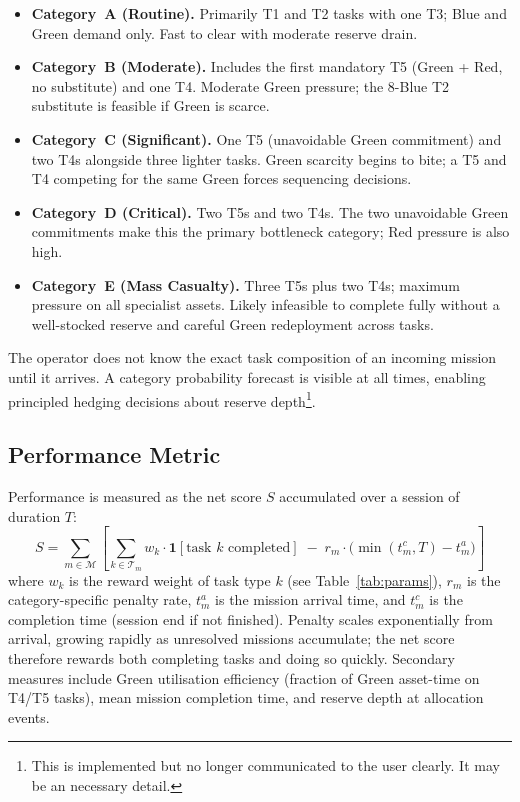 \documentclass[10pt]{article}
\theoremstyle{definition}
\begin{document}
\begin{itemize}[noitemsep]
  \item \textbf{Category~A (Routine).} Primarily T1 and T2 tasks with one T3; Blue and Green demand only. Fast to clear with moderate reserve drain.
  \item \textbf{Category~B (Moderate).} Includes the first mandatory T5 (Green + Red, no substitute) and one T4. Moderate Green pressure; the 8-Blue T2 substitute is feasible if Green is scarce.
  \item \textbf{Category~C (Significant).} One T5 (unavoidable Green commitment) and two T4s alongside three lighter tasks. Green scarcity begins to bite; a T5 and T4 competing for the same Green forces sequencing decisions.
  \item \textbf{Category~D (Critical).} Two T5s and two T4s. The two unavoidable Green commitments make this the primary bottleneck category; Red pressure is also high.
  \item \textbf{Category~E (Mass Casualty).} Three T5s plus two T4s; maximum pressure on all specialist assets. Likely infeasible to complete fully without a well-stocked reserve and careful Green redeployment across tasks.
\end{itemize}

The operator does not know the exact task composition of an incoming mission until it arrives. A category probability forecast is visible at all times, enabling principled hedging decisions about reserve depth\footnote{This is implemented but no longer communicated to the user clearly. It may be an necessary detail.}.

\subsection{Performance Metric}\label{sec:metric}

Performance is measured as the net score $S$ accumulated over a session of duration $T$:
\begin{equation}
S = \sum_{m \in \mathcal{M}} \left[
    \sum_{k \in \mathcal{T}_m} w_k \cdot \mathbf{1}[\text{task } k \text{ completed}]
    \;-\; r_m \cdot \bigl(\min(t^c_m, T) - t^a_m\bigr)
    \right]
\label{eq:score}
\end{equation}
where $w_k$ is the reward weight of task type $k$ (see Table~\ref{tab:params}), $r_m$ is the category-specific penalty rate, $t^a_m$ is the mission arrival time, and $t^c_m$ is the completion time (session end if not finished). Penalty scales exponentially from arrival, growing rapidly as unresolved missions accumulate; the net score therefore rewards both completing tasks and doing so quickly. Secondary measures include Green utilisation efficiency (fraction of Green asset-time on T4/T5 tasks), mean mission completion time, and reserve depth at allocation events.
\end{document}
